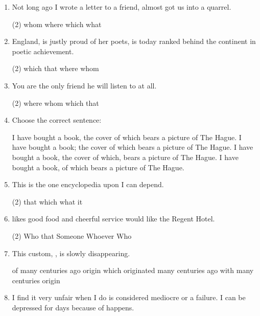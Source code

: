 \begin{enumerate}
\item Not long ago I wrote a letter to a friend, \ttu almost got us into a quarrel.
\begin{tasks}(2)
  \task whom
  \task where
  \task which
  \task what
\end{tasks}

\item England, \ttu is justly proud of her poets, is today ranked behind the continent in poetic achievement.
\begin{tasks}(2)
  \task which
  \task that
  \task where
  \task whom
\end{tasks}

\item You are the only friend \ttu he will listen to at all.
\begin{tasks}(2)
  \task where
  \task whom
  \task which
  \task that
\end{tasks}

\item Choose the correct sentence:
\begin{tasks}
  \task I have bought a book, the cover of which bears a picture of The Hague.
  \task I have bought a book; the cover of which bears a picture of The Hague.
  \task I have bought a book, the cover of which, bears a picture of The Hague.
  \task I have bought a book, of which bears a picture of The Hague.
\end{tasks}

\item This is the one encyclopedia upon \ttu I can depend.
\begin{tasks}(2)
  \task that
  \task which
  \task what
  \task it
\end{tasks}

\item \ttu likes good food and cheerful service would like the Regent Hotel.
\begin{tasks}(2)
  \task Who that
  \task Someone
  \task Whoever
  \task Who
\end{tasks}

\item This custom, \ttu, is slowly disappearing.
\begin{tasks}
  \task of many centuries ago origin
  \task which originated many centuries ago
  \task with many centuries origin
\end{tasks}

\item I find it very unfair when \ttu I do is considered mediocre or a
  failure. I can be depressed for days because of \ttu happens.


\end{enumerate}
